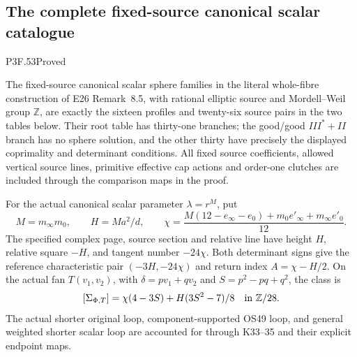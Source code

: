 \subsection{The complete fixed-source canonical scalar catalogue}
\begin{statement}{P3F.53}{Proved}

The fixed-source canonical scalar sphere families in the literal
whole-fibre construction of E26 Remark~8.5, with rational elliptic
source and Mordell--Weil group \(\mathbb Z\), are exactly the
sixteen profiles and twenty-six source pairs in the two tables below.
Their root table has thirty-one branches; the good/good
\(III^*+II\) branch has no sphere solution, and the other thirty
have precisely the displayed coprimality and determinant conditions.
All fixed source coefficients, allowed vertical source lines,
primitive effective cap actions and order-one clutches are included
through the comparison maps in the proof.

For the actual canonical scalar parameter \(\lambda=r^M\), put
\[
 M=m_\infty m_0,\qquad H=Ma^2/d,\qquad
 \chi=\frac{M(12-e_\infty-e_0)+m_0e'_\infty+m_\infty e'_0}{12}.
\]
The specified complex page, source section and relative line have
height \(H\), relative square \(-H\), and tangent number
\(-24\chi\). Both determinant signs give the reference characteristic
pair \((-3H,-24\chi)\) and return index \(A=\chi-H/2\).
On the actual fan \(T(v_1,v_2)\), with
\(\delta=pv_1+qv_2\) and \(S=p^2-pq+q^2\), the class is
\[
 [\Sigma_{\Phi,T}]
       =\chi(4-3S)+H(3S^2-7)/8\quad\hbox{in }\mathbb Z/28.
\]
The actual shorter original loop, component-supported OS49 loop,
and general weighted shorter scalar loop are accounted for through
K33--35 and their explicit endpoint maps.
\end{statement}
